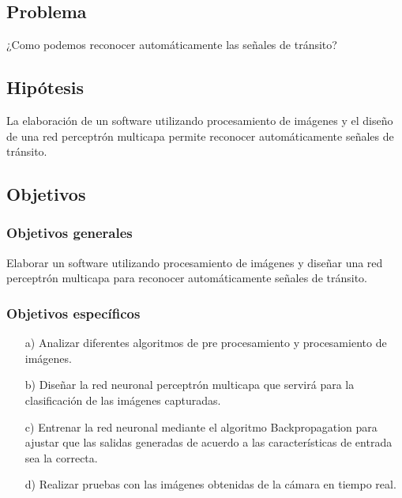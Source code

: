 \documentclass[a4paper, 12pt]{article}
\begin{document}
\subsection{Problema}
¿Como podemos reconocer automáticamente las señales de tránsito?

\subsection{Hipótesis}
La elaboración de un software utilizando procesamiento de imágenes
y el diseño de una red perceptrón multicapa permite reconocer automáticamente señales de tránsito.

\subsection{Objetivos}

\subsubsection{Objetivos generales}
Elaborar un software utilizando procesamiento de imágenes y diseñar una red perceptrón multicapa para reconocer automáticamente señales de tránsito.
\vskip 0.3cm

\subsubsection{Objetivos específicos}
\vskip 0.2cm
\begin{enumerate}
\item[a)] Analizar diferentes algoritmos de pre procesamiento y procesamiento de imágenes.
\item[b)] Diseñar la red neuronal perceptrón multicapa que servirá para la clasificación de las imágenes capturadas.
\item[c)] Entrenar la red neuronal mediante el algoritmo Backpropagation para  ajustar que las salidas generadas de acuerdo a las características de entrada sea la correcta.
\item[d)] Realizar pruebas con las imágenes obtenidas de la cámara en tiempo real.

\end{enumerate}
\end{document}
